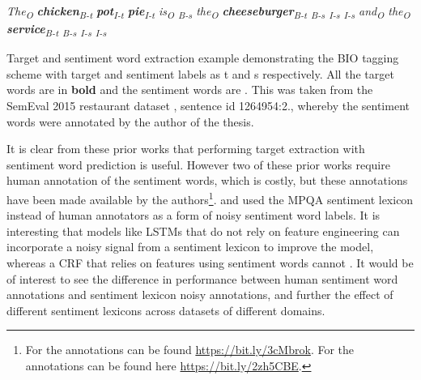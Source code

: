 \begin{example}
\textit{The\textsubscript{O} \textbf{chicken}\textsubscript{B-t} \textbf{pot}\textsubscript{I-t} \textbf{pie}\textsubscript{I-t} is\textsubscript{O} \textsubscript{B-s} the\textsubscript{O} \textbf{cheeseburger}\textsubscript{B-t} \textsubscript{B-s} \textsubscript{I-s} \textsubscript{I-s} and\textsubscript{O} the\textsubscript{O} \textbf{service}\textsubscript{B-t} \textsubscript{B-s} \textsubscript{I-s} \textsubscript{I-s}}
\caption{Target and sentiment word extraction example demonstrating the BIO tagging scheme with target and sentiment labels as t and s respectively. All the target words are in \textbf{bold} and the sentiment words are . This was taken from the SemEval 2015 restaurant dataset \citep{pontiki-etal-2015-semeval}, sentence id 1264954:2., whereby the sentiment words were annotated by the author of the thesis.}
\label{example:lit_review_target_extraction_sentiment_bio}
\end{example}

It is clear from these prior works that performing target extraction with sentiment word prediction is useful. However two of these prior works \citep{wang-etal-2016-recursive, wang2017coupled} require human annotation of the sentiment words, which is costly, but these annotations have been made available by the authors\footnote{For \citet{wang-etal-2016-recursive} the annotations can be found \url{https://bit.ly/3cMbrok}. For \citet{wang2017coupled} the annotations can be found here \url{https://bit.ly/2zh5CBE}.}. \citet{li-lam-2017-deep} and \citet{li2018aspect} used the MPQA sentiment lexicon \citep{wilson-etal-2005-recognizing} instead of human annotators as a form of noisy sentiment word labels. It is interesting that models like LSTMs that do not rely on feature engineering can incorporate a noisy signal from a sentiment lexicon to improve the model, whereas a CRF that relies on features using sentiment words cannot \citep{jakob-gurevych-2010-extracting}. It would be of interest to see the difference in performance between human sentiment word annotations and sentiment lexicon noisy annotations, and further the effect of different sentiment lexicons across datasets of different domains. 

